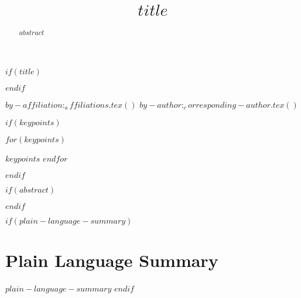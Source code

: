 $if(title)$
\title{$title$}
$endif$


$by-affiliation:_affiliations.tex()$
$by-author:_corresponding-author.tex()$

$if(keypoints)$
\begin{keypoints}
$for(keypoints)$\item $keypoints$ $endfor$
\end{keypoints}
$endif$

$if(abstract)$
\begin{abstract}
$abstract$
\end{abstract}
$endif$

$if(plain-language-summary)$
\section*{Plain Language Summary}
$plain-language-summary$
$endif$



